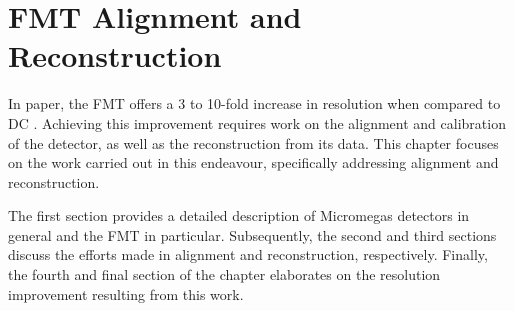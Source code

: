 \section{FMT Alignment and Reconstruction}
\label{12::fmt_alignment_and_reconstruction}
    In paper, the FMT offers a 3 to 10-fold increase in resolution when compared to DC \cite{aune2009}.
    Achieving this improvement requires work on the alignment and calibration of the detector, as well as the reconstruction from its data.
    This chapter focuses on the work carried out in this endeavour, specifically addressing alignment and reconstruction.

    The first section provides a detailed description of Micromegas detectors in general and the FMT in particular.
    Subsequently, the second and third sections discuss the efforts made in alignment and reconstruction, respectively.
    Finally, the fourth and final section of the chapter elaborates on the resolution improvement resulting from this work.

    
    
    
    

